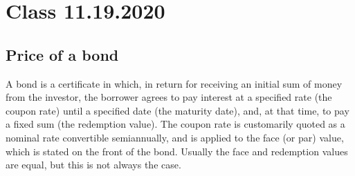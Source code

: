 \documentclass[../00_main.tex]{subfiles}
\begin{document}
\section{Class 11.19.2020}

\subsection{Price of a bond}

A bond is a certificate in which, in return for receiving an initial sum of 
money from the investor, the borrower agrees to pay interest at a specified 
rate (the coupon rate) until a specified date (the maturity date), and, at that 
time, to pay a fixed sum (the redemption value). The coupon rate is customarily 
quoted as a nominal rate convertible semiannually, and is applied to the face 
(or par) value, which is stated on the front of the bond. Usually the face and
redemption values are equal, but this is not always the case.
\end{document}
